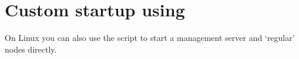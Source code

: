 


\section{Custom startup using \texorpdfstring{}{scalarisctl}}
\label{user.config.scalarisctl}

On Linux you can also use the  script to start a
management server and `regular' nodes directly.
\begin{lstlisting}[language=sh]
%> ./bin/scalarisctl -h
\end{lstlisting}


